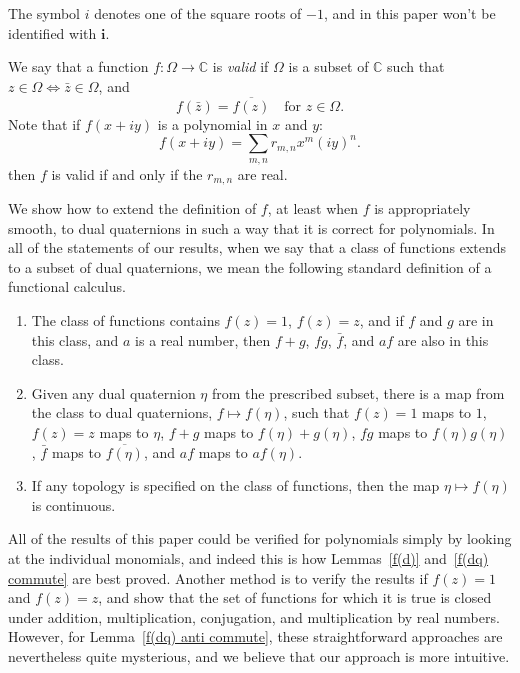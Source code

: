 \documentclass[12pt,reqno]{amsart}
\newcommand\bi{\bm i}
\begin{document}
The symbol $i$ denotes one of the square roots of $-1$, and in this paper won't be identified with $\bi$.

We say that a function $f:\Omega \to \mathbb C$ is \emph{valid} if $\Omega$ is a subset of $\mathbb C$ such that $z\in\Omega \Leftrightarrow \bar z \in \Omega$, and
\begin{equation}
f(\bar z) = \overline{f(z)} \quad \text{for $z \in \Omega$.}
\end{equation}
Note that if $f(x+iy)$ is a polynomial in $x$ and $y$:
\begin{equation}
f(x+iy) = \sum_{m,n} r_{m,n} x^m (iy)^n.
\end{equation}
then $f$ is valid if and only if the $r_{m,n}$ are real.

We show how to extend the definition of $f$, at least when $f$ is appropriately smooth, to dual quaternions in such a way that it is correct for polynomials.  In all of the statements of our results, when we say that a class of functions extends to a subset of dual quaternions, we mean the following standard definition of a functional calculus.
\begin{enumerate}
\item The class of functions contains $f(z) = 1$, $f(z) = z$, and if $f$ and $g$ are in this class, and $a$ is a real number, then $f+g$, $fg$, $\bar f$, and $a f$ are also in this class.
\item Given any dual quaternion $\eta$ from the prescribed subset, there is a map from the class to dual quaternions, $f \mapsto f(\eta)$, such that $f(z) = 1$ maps to $1$, $f(z) = z$ maps to $\eta$, $f+g$ maps to $f(\eta) + g(\eta)$, $fg$ maps to $f(\eta) g(\eta)$, $\bar f$ maps to $\overline{f(\eta)}$, and $a f$ maps to $a f(\eta)$.
\item If any topology is specified on the class of functions, then the map $\eta \mapsto f(\eta)$ is continuous.
\end{enumerate}
All of the results of this paper could be verified for polynomials simply by looking at the individual monomials, and indeed this is how Lemmas~\ref{f(d)} and~\ref{f(dq) commute} are best proved.  Another method is to verify the results if $f(z) = 1$ and $f(z) = z$, and show that the set of functions for which it is true is closed under addition, multiplication, conjugation, and multiplication by real numbers.  However, for Lemma~\ref{f(dq) anti commute}, these straightforward approaches are nevertheless quite mysterious, and we believe that our approach is more intuitive.
\end{document}
